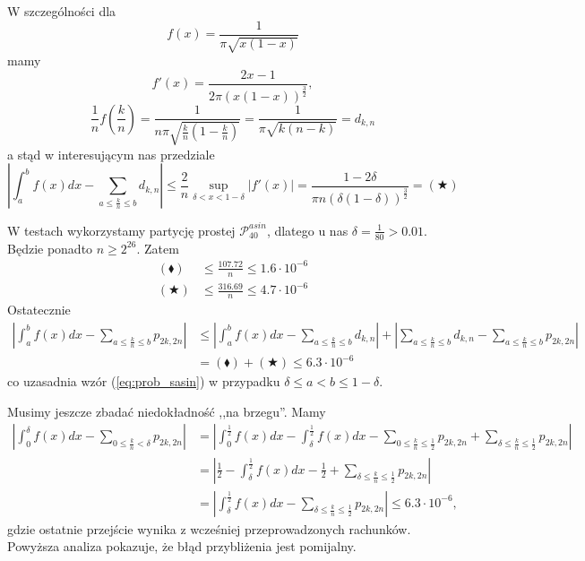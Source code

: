 \documentclass[a4paper,11pt,twoside]{book}
\theoremstyle{definition}
\begin{document}
W szczególności dla
\[ f(x) = \frac{1}{\pi \sqrt{x(1-x)}} \] mamy
\[ f'(x) = \frac{2x-1}{2 \pi (x(1-x))^{\frac{3}{2}}}, \]
\[ \frac{1}{n}f\left(\frac{k}{n} \right) = \frac{1}{n\pi \sqrt{ \frac{k}{n}(1-\frac{k}{n})}} = \frac{1}{\pi \sqrt{k(n-k)}} = d_{k,n}  \]
a stąd w interesującym nas przedziale
\[  \left| \int_a^b f(x) dx - \sum\limits_{a \leq \frac{k}{n} \leq b}d_{k,n} \right| \leq \frac{2}{n} \sup_{\delta < x < 1-\delta} |f'(x)| = \frac{1 - 2\delta}{\pi n (\delta(1-\delta))^{\frac{3}{2}}} = (\bigstar) \]

W testach wykorzystamy partycję prostej $\mathcal{P}^{asin}_{40}$, dlatego u nas $\delta = \frac{1}{80} > 0.01$. Będzie ponadto $n \geq 2^{26}$. Zatem
\begin{equation*}
 \begin{split}
  (\blacklozenge) &\leq \frac{107.72}{n} \leq 1.6 \cdot 10^{-6} \\
  (\bigstar) &\leq \frac{316.69}{n} \leq 4.7 \cdot 10^{-6}
 \end{split}
\end{equation*}
Ostatecznie
\begin{equation*}
\begin{split}
\left| \int_a^b f(x) dx - \sum\limits_{a \leq \frac{k}{n} \leq b} p_{2k,2n} \right|
  &\leq \left| \int_a^b f(x) dx - \sum\limits_{a \leq \frac{k}{n} \leq b} d_{k,n} \right| +  \left| \sum\limits_{a \leq \frac{k}{n} \leq b} d_{k,n} - \sum\limits_{a \leq \frac{k}{n} \leq b} p_{2k,2n} \right| \\
  &= (\blacklozenge) + (\bigstar) \leq 6.3 \cdot 10^{-6}
\end{split} 
\end{equation*}
co uzasadnia wzór (\ref{eq:prob_sasin}) w przypadku $\delta \leq a < b \leq 1 - \delta$. 

Musimy jeszcze zbadać niedokładność ,,na brzegu''. Mamy
\begin{equation*}
\begin{split}
  \left| \int_0^\delta f(x) dx - \sum\limits_{0 \leq \frac{k}{n} < \delta} p_{2k,2n} \right| &= \left| \int_0^{\frac{1}{2}} f(x) dx -  \int_\delta^{\frac{1}{2}} f(x) dx - \sum\limits_{0 \leq \frac{k}{n} \leq \frac{1}{2}} p_{2k,2n} + \sum\limits_{\delta \leq \frac{k}{n} \leq \frac{1}{2}} p_{2k,2n} \right| \\
  &= \left| \frac{1}{2} -  \int_\delta^{\frac{1}{2}} f(x) dx - \frac{1}{2} + \sum\limits_{\delta \leq \frac{k}{n} \leq \frac{1}{2}} p_{2k,2n} \right| \\
  &= \left|\int_\delta^{\frac{1}{2}} f(x) dx - \sum\limits_{\delta \leq \frac{k}{n} \leq \frac{1}{2}} p_{2k,2n} \right| \leq 6.3 \cdot 10^{-6},
\end{split}
\end{equation*}
gdzie ostatnie przejście wynika z wcześniej przeprowadzonych rachunków. Powyższa analiza pokazuje, że błąd przybliżenia jest pomijalny.
\end{document}
